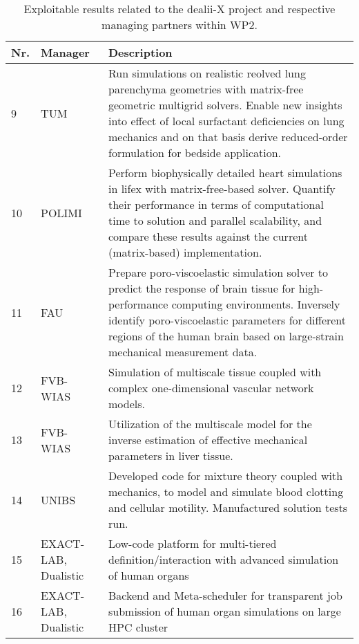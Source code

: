 \documentclass[a4paper,12pt]{article}
\begin{document}
\begin{center}
    \small
    \renewcommand{\arraystretch}{1.25}
    \begin{longtable}{|l|p{2.5cm}|p{12cm}|}
    \caption{Exploitable results related to the dealii-X project and respective managing partners within WP2.}
    \label{tab:exploitable_results_WP2}
    \\
    \hline
    \textbf{Nr.} & \textbf{Manager} & \textbf{Description} \\
    \hline
    9 & TUM &
    Run simulations on realistic reolved lung parenchyma geometries with matrix-free geometric multigrid solvers. Enable new insights into effect of local surfactant deficiencies on lung mechanics and on that basis derive reduced-order formulation for bedside application.
    \\
    \hline
    10 & POLIMI &
    Perform biophysically detailed heart simulations in lifex with matrix-free-based solver. Quantify their performance in terms of computational time to solution and parallel scalability, and compare these results against the current (matrix-based) implementation.
    \\
    \hline
    11 & FAU &
    Prepare poro-viscoelastic simulation solver to predict the response of brain tissue for high-performance computing environments. Inversely identify poro-viscoelastic parameters for different regions of the human brain based on large-strain mechanical measurement data.
    \\
    \hline
    12 & FVB-WIAS &
    Simulation of multiscale tissue coupled with complex one-dimensional vascular network models.
    \\
    \hline
    13 & FVB-WIAS &
    Utilization of the multiscale model for the inverse estimation of effective mechanical parameters in liver tissue. 
    \\
    \hline
    14 & UNIBS &
    Developed code for mixture theory coupled with mechanics, to model and simulate blood clotting and cellular motility. Manufactured solution tests run.
    \\
    \hline
    15 & EXACT-LAB, Dualistic &
    Low-code platform for multi-tiered definition/interaction with advanced simulation of human organs
    \\
    \hline
    16 & EXACT-LAB, Dualistic &
    Backend and Meta-scheduler for transparent job submission of human organ simulations on large HPC cluster 
    \\
    \hline
    \end{longtable}
\end{center}
\end{document}
